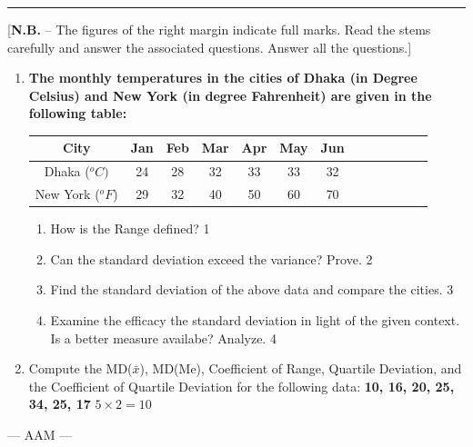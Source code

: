 \documentclass[12pt]{article}
\begin{document}
\hrule


\begin{center}
[\textbf{N.B.} – The figures of the right margin indicate full marks. Read 
the stems carefully and answer the associated questions. Answer all the questions.]\\
\end{center}


  \begin{enumerate}
  
     \item
  \textbf{The monthly temperatures in the cities of Dhaka (in Degree Celsius) and New York (in degree Fahrenheit) are given in the following table:}
  
  
\begin{table}[H]
\centering
\begin{tabular}{|c|c|c|c|c|c|c|c|c|c|c|c|c|}
\hline
City             & Jan  & Feb  & Mar  & Apr  & May  & Jun   \\ \hline
Dhaka ($^o C)$   & 24 & 28 & 32 & 33 & 33 & 32\\ \hline
New York ($^oF$) & 29   & 32   & 40   & 50   & 60   & 70  \\ \hline
\end{tabular}
\end{table}

  
  \begin{enumerate}
    \item
	How is the Range defined? \hfill 1
    \item
	Can the standard deviation exceed the variance? Prove. \hfill 2
    \item  
	Find the standard deviation of the above data and compare the cities. \hfill 3
    \item
	Examine the efficacy the standard deviation in light of the given context. \\ Is a better measure availabe? Analyze. \hfill 4
  \end{enumerate}
  
  \item {Compute the MD($\bar x$), MD(Me), Coefficient of Range, Quartile Deviation, and the Coefficient of Quartile Deviation for the following data:  \textbf{10, 16, 20, 25, 34, 25, 17}}  \hfill $5 \times 2 = 10$


\end{enumerate}
\begin{center}
--- AAM ---
\end{center}
\end{document}
